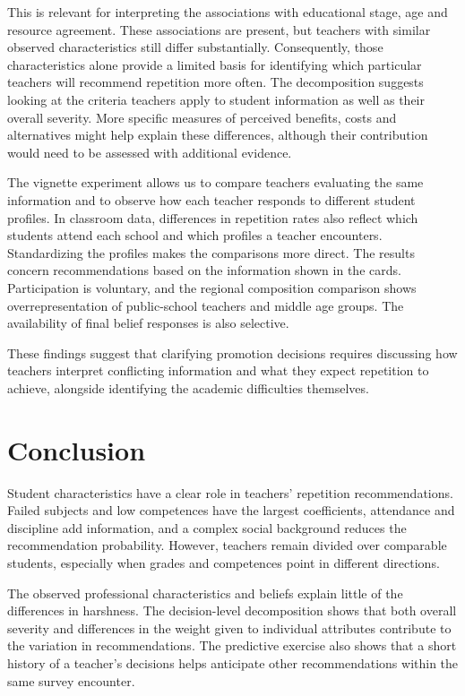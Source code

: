 This is relevant for interpreting the associations with educational stage, age and resource agreement. These associations are present, but teachers with similar observed characteristics still differ substantially. Consequently, those characteristics alone provide a limited basis for identifying which particular teachers will recommend repetition more often. The decomposition suggests looking at the criteria teachers apply to student information as well as their overall severity. More specific measures of perceived benefits, costs and alternatives might help explain these differences, although their contribution would need to be assessed with additional evidence.

The vignette experiment allows us to compare teachers evaluating the same information and to observe how each teacher responds to different student profiles. In classroom data, differences in repetition rates also reflect which students attend each school and which profiles a teacher encounters. Standardizing the profiles makes the comparisons more direct. The results concern recommendations based on the information shown in the cards. Participation is voluntary, and the regional composition comparison shows overrepresentation of public-school teachers and middle age groups. The availability of final belief responses is also selective.

These findings suggest that clarifying promotion decisions requires discussing how teachers interpret conflicting information and what they expect repetition to achieve, alongside identifying the academic difficulties themselves.

\enlargethispage{2\baselineskip}
\section{Conclusion}\label{sec:conclusion}
Student characteristics have a clear role in teachers' repetition recommendations. Failed subjects and low competences have the largest coefficients, attendance and discipline add information, and a complex social background reduces the recommendation probability. However, teachers remain divided over comparable students, especially when grades and competences point in different directions.

The observed professional characteristics and beliefs explain little of the differences in harshness. The decision-level decomposition shows that both overall severity and differences in the weight given to individual attributes contribute to the variation in recommendations. The predictive exercise also shows that a short history of a teacher's decisions helps anticipate other recommendations within the same survey encounter.

